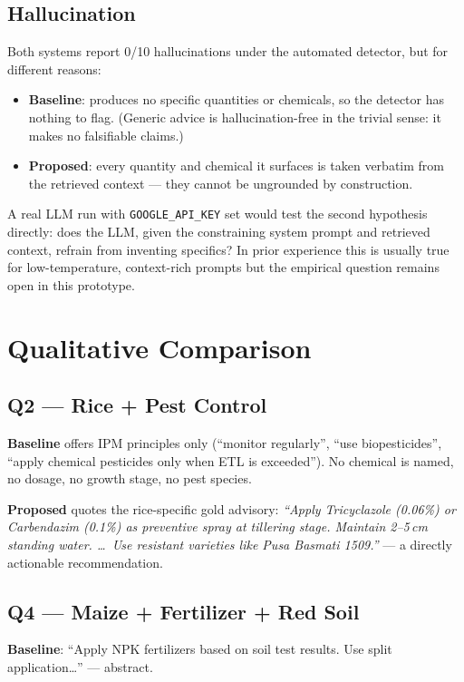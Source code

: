 \documentclass[11pt,a4paper]{article}
\begin{document}
\subsection{Hallucination}
Both systems report 0/10 hallucinations under the automated detector,
but for different reasons:

\begin{itemize}[leftmargin=*]
  \item \textbf{Baseline}: produces no specific quantities or
        chemicals, so the detector has nothing to flag. (Generic
        advice is hallucination-free in the trivial sense: it makes
        no falsifiable claims.)
  \item \textbf{Proposed}: every quantity and chemical it surfaces is
        taken verbatim from the retrieved context --- they cannot be
        ungrounded by construction.
\end{itemize}

A real LLM run with \texttt{GOOGLE\_API\_KEY} set would test the
second hypothesis directly: does the LLM, given the constraining
system prompt and retrieved context, refrain from inventing
specifics? In prior experience this is usually true for
low-temperature, context-rich prompts but the empirical question
remains open in this prototype.

\section{Qualitative Comparison}\label{sec:qualitative}

\subsection{Q2 --- Rice + Pest Control}
\textbf{Baseline} offers IPM principles only (``monitor regularly'',
``use biopesticides'', ``apply chemical pesticides only when ETL is
exceeded''). No chemical is named, no dosage, no growth stage, no
pest species.

\textbf{Proposed} quotes the rice-specific gold advisory: \emph{``Apply
Tricyclazole (0.06\%) or Carbendazim (0.1\%) as preventive spray at
tillering stage. Maintain 2--5\,cm standing water. \ldots\ Use
resistant varieties like Pusa Basmati 1509.''} --- a directly
actionable recommendation.

\subsection{Q4 --- Maize + Fertilizer + Red Soil}
\textbf{Baseline}: ``Apply NPK fertilizers based on soil test results.
Use split application\ldots'' --- abstract.
\end{document}
